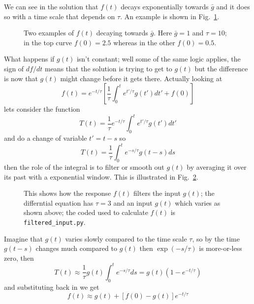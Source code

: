 \documentclass{article}
\begin{document}
We can see in the
solution that $f(t)$ decays exponentially towards $\bar{g}$ and it
does so with a time scale that depends on $\tau$. An example is shown in Fig.~\ref{exp_decay}.

\begin{figure}[tb]
\begin{center}

\end{center}
\caption{Two examples of $f(t)$ decaying towards $\bar{g}$. Here
  $\bar{g}=1$ and $\tau=10$; in the top curve $f(0)=2.5$ whereas in
  the other $f(0)=0.5$. \label{exp_decay}}
\end{figure}

What happens if $g(t)$ isn't constant; well some of the same logic applies, the sign of $df/dt$ means that the solution is trying to get to $g(t)$ but the difference is now that $g(t)$ might change before it gets there. Actually looking at 
\begin{equation}
f(t)=e^{-t/\tau}\left[\frac{1}{\tau}\int_0^t e^{t'/\tau} g(t')dt'+f(0)\right]
\end{equation}
lets consider the function
\begin{equation}
T(t)=\frac{1}{\tau}e^{-t/\tau}\int_0^t e^{t'/\tau} g(t')dt'
\end{equation}
and do a change of variable $t'=t-s$ so 
\begin{equation}
T(t)=\frac{1}{\tau}\int_0^t e^{-s/\tau} g(t-s)ds
\end{equation}
then the role of the integral is to filter or smooth out $g(t)$ by
averaging it over its past with a exponential window. This is
illustrated in Fig.~\ref{filtering}.

\begin{figure}[tb]
\begin{center}

\end{center}
\caption{This shows how the response $f(t)$ filters the input $g(t)$;
  the differntial equation has $\tau=3$ and an input $g(t)$ which
  varies as shown above; the coded used to calculate $f(t)$ is
  \texttt{filtered\_input.py}. \label{filtering}}
\end{figure}

Imagine that $g(t)$ varies slowly compared to the time scale $\tau$, so by the time $g(t-s)$ changes much compared to $g(t)$ then $\exp(-s/\tau)$ is more-or-less zero, then
\begin{equation}
T(t)\approx\frac{1}{\tau}g(t)\int_0^t e^{-s/\tau}ds=g(t)\left(1-e^{-t/\tau}\right)
\end{equation}
and substituting back in we get
\begin{equation}
f(t)\approx g(t)+[f(0)-g(t)]e^{-t/\tau}
\end{equation}
\end{document}
